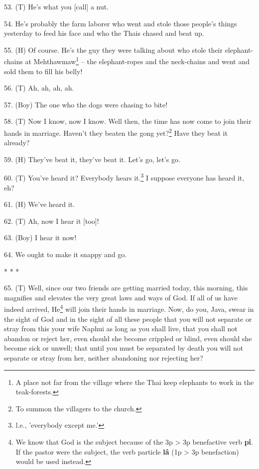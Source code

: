 53. (T) He's what you [call] a nut.

54. He's probably the farm laborer who went and stole those people's things yesterday
to feed his face and who the Thais chased and beat up.

55. (H) Of course. He's the guy they were talking about who stole their elephant-chains
at Mehthawmaw\footnote{A place not far from the village where the Thai keep elephants to work in the teak-forests.} -- the elephant-ropes and the neck-chains and went and sold them
to fill his belly!

56. (T) Ah, ah, ah, ah.

57. (Boy) The one who the dogs were chasing to bite!

58. (T) Now I know, now I know. Well then, the time has now come to join their
hands in marriage. Haven't they beaten the gong yet?\footnote{To summon the villagers to the church.} Have they beat it already?

59. (H) They've beat it, they've beat it. Let's go, let's go.

60. (T) You've heard it? Everybody hears it.\footnote{l.e., 'everybody except me.'} I suppose everyone has heard it,
eh?

61. (H) We've heard it.

62. (T) Ah, now I hear it [too]!

63. (Boy) I hear it now!

64. We ought to make it snappy and go.

\begin{center}
* * *

\end{center}

65. (T) Well, since our two friends are getting married today, this morning, this
magnifies and elevates the very great laws and ways of God. If all of us have indeed
arrived, He\footnote{We know that God is the subject because of the 3p > 3p benefactive verb \textbf{pî}. If the pastor were the subject, the verb particle \textbf{lâ} (1p > 3p benefaction) would be used instead.} will join their hands in marriage. Now, do you, Java, swear in
the sight of God and in the sight of all these people that you will not separate
or stray from this your wife Naphui as long as you shall live, that you shall not
abandon or reject her, even should she become crippled or blind, even should she
become sick or unwell; that until you must be separated by death you will not separate
or stray from her, neither abandoning nor rejecting her?

